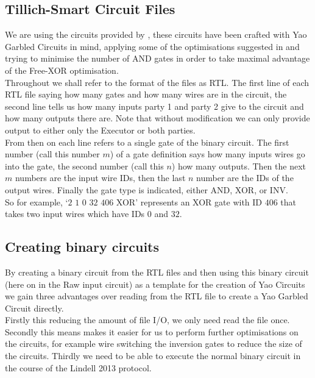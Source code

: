 \documentclass[ %
                    author={Nicholas Tutte},
                supervisor={Prof. Nigel Smart},
                    degree={MEng},
                     title={Secure Two Party Computation},
                  subtitle={A practical comparison of recent protocols},
                      type={Research - GG1K},
                      year={2015} ]{dissertation}
\begin{document}
			\subsection{Tillich-Smart Circuit Files}

				We are using the circuits provided by \cite{NigelCircuits}, these circuits have been crafted with Yao Garbled Circuits in mind, applying some of the optimisations suggested in \cite{SMC_Is_Practical} and trying to minimise the number of AND gates in order to take maximal advantage of the Free-XOR optimisation.\\

				Throughout we shall refer to the format of the files as RTL. The first line of each RTL file saying how many gates and how many wires are in the circuit, the second line tells us how many inputs party 1 and party 2 give to the circuit and how many outputs there are. Note that without modification we can only provide output to either only the Executor or both parties.\\

				From then on each line refers to a single gate of the binary circuit. The first number (call this number $m$) of a gate definition says how many inputs wires go into the gate, the second number (call this $n$) how many outputs. Then the next $m$ numbers are the input wire IDs, then the last $n$ number are the IDs of the output wires. Finally the gate type is indicated, either AND, XOR, or INV.\\

				So for example, `$2$ $1$ $0$ $32$ $406$ XOR' represents an XOR gate with ID $406$ that takes two input wires which have IDs $0$ and $32$.

			\subsection{Creating binary circuits}
				By creating a binary circuit from the RTL files and then using this binary circuit (here on in the Raw input circuit) as a template for the creation of Yao Circuits we gain three advantages over reading from the RTL file to create a Yao Garbled Circuit directly.\\

				Firstly this reducing the amount of file I/O, we only need read the file once. Secondly this means makes it easier for us to perform further optimisations on the circuits, for example wire switching the inversion gates to reduce the size of the circuits. Thirdly we need to be able to execute the normal binary circuit in the course of the Lindell 2013 protocol.\\
\end{document}
